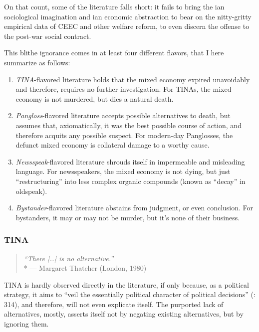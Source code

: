 \documentclass[11pt,a4paper,oneside,openright]{article}
\begin{document}
On that count, some of the literature falls short: it fails to bring the \citeauthor{Mills-1959-aa}ian sociological imagination and \citeauthor{Keynes1936}ian economic abstraction to bear on the nitty-gritty empirical data of \gls{CEEC} and other welfare reform, to even discern  the offense to the post-war social contract. %

This blithe ignorance comes in at least four different flavors, that I here summarize as follows:
\begin{enumerate}
	\item \emph{TINA}-flavored literature holds that the mixed economy expired unavoidably and therefore, requires no further investigation. For TINAs, the mixed economy is not murdered, but dies a natural death.
	\item \emph{Pangloss}-flavored literature accepts possible alternatives to death, but assumes that, axiomatically, it was the best possible course of action, and therefore acquits any possible suspect. For modern-day Panglosses, the defunct mixed economy is collateral damage to a worthy cause.
	\item \emph{Newsspeak}-flavored literature shrouds itself in impermeable and misleading language. For newsspeakers, the mixed economy is not dying, but just ``restructuring'' into less complex organic compounds (known as ``decay'' in oldspeak).
	\item \emph{Bystander}-flavored literature abstains from judgment, or even conclusion. For bystanders, it may or may not be murder, but it's none of their business. %
\end{enumerate}

\subsubsection{TINA}

\begin{quote}
	\emph{``There [\ldots] is no alternative.''}\\*
	--- Margaret Thatcher (London, 1980)
\end{quote}

TINA is hardly observed directly in the literature, if only because, as a political strategy, it aims to ``veil the essentially political character of political decisions'' (\citealt{Bluhdorn-2007-aa}: 314), and therefore, will not even explicate itself. The purported lack of alternatives, mostly, asserts itself not by negating existing alternatives, but by ignoring them.  
\end{document}
